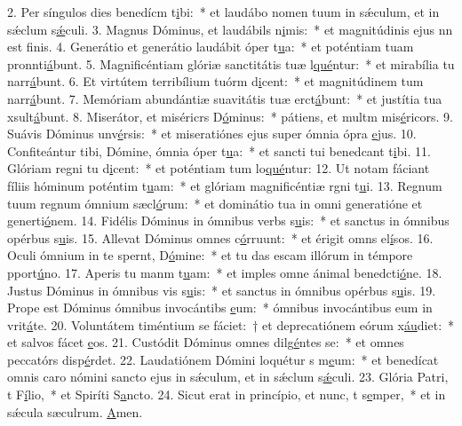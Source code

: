 2. Per síngulos dies benedícm t\uline{i}bi:~* et laudábo nomen tuum in sǽculum, et in sǽclum s\uline{ǽ}culi.
3. Magnus Dóminus, et laudábils n\uline{i}mis:~* et magnitúdinis ejus nn est f\uline{i}nis.
4. Generátio et generátio laudábit óper t\uline{u}a:~* et poténtiam tuam pronnti\uline{á}bunt.
5. Magnificéntiam glóriæ sanctitátis tuæ l\uline{qué}ntur:~* et mirabília tu narr\uline{á}bunt.
6. Et virtútem terribílium tuórm d\uline{i}cent:~* et magnitúdinem tum narr\uline{á}bunt.
7. Memóriam abundántiæ suavitátis tuæ erct\uline{á}bunt:~* et justítia tua xsult\uline{á}bunt.
8. Miserátor, et miséricrs D\uline{ó}minus:~* pátiens, et multm mis\uline{é}ricors.
9. Suávis Dóminus unv\uline{é}rsis:~* et miseratiónes ejus super ómnia ópra \uline{e}jus.
10. Confiteántur tibi, Dómine, ómnia óper t\uline{u}a:~* et sancti tui benedcant t\uline{i}bi.
11. Glóriam regni tu d\uline{i}cent:~* et poténtiam tum lo\uline{qué}ntur:
12. Ut notam fáciant fíliis hóminum poténtim t\uline{u}am:~* et glóriam magnificéntiæ rgni t\uline{u}i.
13. Regnum tuum regnum ómnium sæcl\uline{ó}rum:~* et dominátio tua in omni generatióne et generti\uline{ó}nem.
14. Fidélis Dóminus in ómnibus verbs s\uline{u}is:~* et sanctus in ómnibus opérbus s\uline{u}is.
15. Allevat Dóminus omnes  c\uline{ó}rruunt:~* et érigit omns el\uline{í}sos.
16. Oculi ómnium in te spernt, D\uline{ó}mine:~* et tu das escam illórum in témpore pport\uline{ú}no.
17. Aperis tu manm t\uline{u}am:~* et imples omne ánimal benedcti\uline{ó}ne.
18. Justus Dóminus in ómnibus vis s\uline{u}is:~* et sanctus in ómnibus opérbus s\uline{u}is.
19. Prope est Dóminus ómnibus invocántibs \uline{e}um:~* ómnibus invocántibus eum in vrit\uline{á}te.
20. Voluntátem timéntium se fáciet:~† et deprecatiónem eórum x\uline{áu}diet:~* et salvos fácet \uline{e}os.
21. Custódit Dóminus omnes dilg\uline{é}ntes se:~* et omnes peccatórs disp\uline{é}rdet.
22. Laudatiónem Dómini loquétur s m\uline{e}um:~* et benedícat omnis caro nómini sancto ejus in sǽculum, et in sǽclum s\uline{ǽ}culi.
23. Glória Patri, t F\uline{í}lio,~* et Spiríti S\uline{a}ncto.
24. Sicut erat in princípio, et nunc, t s\uline{e}mper,~* et in sǽcula sæculrum. \uline{A}men.
